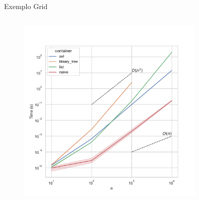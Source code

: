 \documentclass[aspectratio=169,usenames,dvipsnames]{beamer}
\begin{document}
\begin{frame}{Exemplo Grid}
\begin{columns}
\begin{column}{0.65\textwidth}
\begin{figure}
        \includegraphics[width=0.8\textwidth]{figs/tempos/plot_grid_time.pdf}
      \end{figure}
    \end{column}
  \end{columns}
\end{frame}
\end{document}
